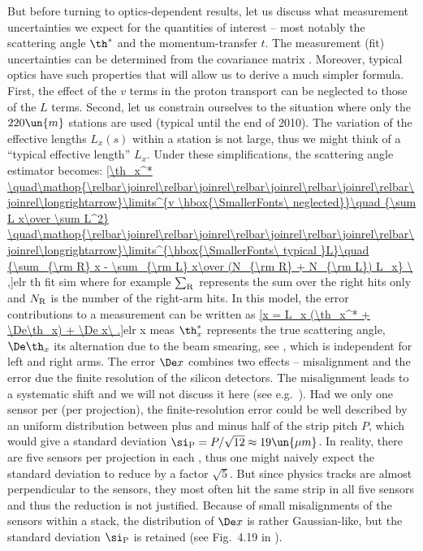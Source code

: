 But before turning to optics-dependent results, let us discuss what measurement uncertainties we expect for the quantities of interest -- most notably the scattering angle $\th^*$ and the momentum-transfer $t$. The measurement (fit) uncertainties can be determined from the covariance matrix . Moreover, typical  optics
have such properties that will allow us to derive a much simpler formula. First, the effect of the $v$ terms in the proton transport  can be neglected to those of the $L$ terms. Second, let us constrain ourselves to the situation where only the $220\un{m}$ stations are used (typical until the end of 2010). The variation of the effective lengths $L_x(s)$ within a station is not large, thus we might think of a ``typical effective length'' $L_x$. Under these simplifications, the scattering angle estimator becomes:
\eqref{\th_x^*
	\quad\mathop{\relbar\joinrel\relbar\joinrel\relbar\joinrel\relbar\joinrel\relbar\joinrel\longrightarrow}\limits^{v \hbox{\SmallerFonts\ neglected}}\quad
		{\sum L x\over \sum L^2}
	\quad\mathop{\relbar\joinrel\relbar\joinrel\relbar\joinrel\relbar\joinrel\relbar\joinrel\longrightarrow}\limits^{\hbox{\SmallerFonts\ typical }L}\quad
	{\sum_{\rm R} x - \sum_{\rm L} x\over (N_{\rm R} + N_{\rm L}) L_x}
\ ,}{elr th fit sim} 
where for example $\sum_{\rm R}$ represents the sum over the right hits only and $N_{\rm R}$ is the number of the right-arm hits. In this model, the error contributions to a measurement can be written as
\eqref{x = L_x (\th_x^* + \De\th_x) + \De x\ .}{elr x meas}
$\th_x^*$ represents the true scattering angle, $\De\th_x$ its alternation due to the beam smearing, see , which is independent for left and right arms. The error $\De x$ combines two effects -- misalignment and the error due the finite resolution of the silicon detectors. The misalignment leads to a systematic shift and we will not discuss it here (see e.g.~). Had we only one sensor per  (per projection), the finite-resolution error could be well described by an uniform distribution between plus and minus half of the strip pitch $P$, which would give a standard deviation $\si_{\rm P} = P/\sqrt{12}\approx 19\un{\mu m}$. In reality, there are five sensors per projection in each , thus one might naively expect the standard deviation to reduce by a factor $\sqrt 5$. But since physics tracks are almost perpendicular to the sensors, they most often hit the same strip in all five sensors and thus the reduction is not justified. Because of small misalignments of the sensors within a stack, the distribution of $\De x$ is rather Gaussian-like, but the standard deviation $\si_{\rm P}$ is retained (see Fig.~4.19 in ).

